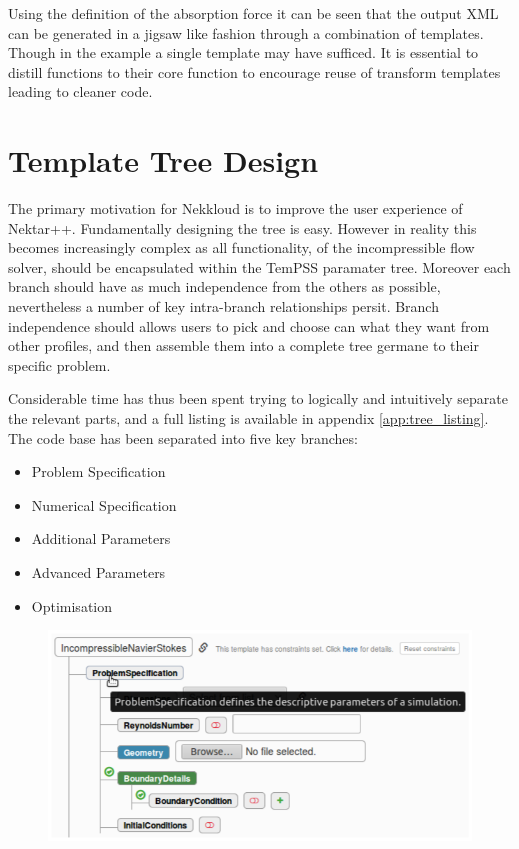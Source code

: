 \documentclass[11pt, a4paper]{report}
\begin{document}
Using the definition of the absorption force it can be seen that the output XML can be generated in a jigsaw like fashion through a combination of templates. Though in the example a single template may have sufficed. It is essential to distill functions to their core function to encourage reuse of transform templates leading to cleaner code.

\section{Template Tree Design}
The primary motivation for Nekkloud is to improve the user experience of Nektar++. Fundamentally designing the tree is easy. However in reality this becomes increasingly complex as all functionality, of the incompressible flow solver, should be encapsulated within the TemPSS paramater tree. Moreover each branch should have as much independence from the others as possible, nevertheless a number of key intra-branch relationships persit. Branch independence should allows users to pick and choose can what they want from other profiles, and then assemble them into a complete tree germane to their specific problem.

Considerable time has thus been spent trying to logically and intuitively separate the relevant parts, and a full listing is available in appendix \ref{app:tree_listing}. The code base has been separated into five key branches:

\begin{itemize}
\item Problem Specification
\item Numerical Specification
\item Additional Parameters
\item Advanced Parameters
\item Optimisation
\end{itemize}

\begin{figure}[htb!]
 \centering
 \includegraphics[width=.75\linewidth,  clip=true, trim = 0cm 0cm 0cm 0cm]{documentation}
 \label{fig:documentation}
\end{figure}
\end{document}

